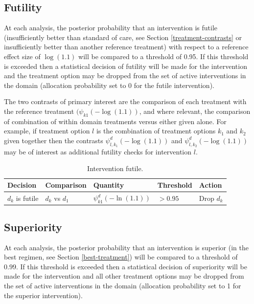 \documentclass[
  11pt,
]{article}
\begin{document}
\hypertarget{futility}{%
\subsection{Futility}\label{futility}}

At each analysis, the posterior probability that an intervention is futile (insufficiently better than standard of care, see Section \ref{treatment-contrasts} or insufficiently better than another reference treatment) with respect to a reference effect size of \(\log(1.1)\) will be compared to a threshold of 0.95.
If this threshold is exceeded then a statistical decision of futility will be made for the intervention and the treatment option may be dropped from the set of active interventions in the domain (allocation probability set to 0 for the futile intervention).

The two contrasts of primary interest are the comparison of each treatment with the reference treatment \((\psi_{k1}(-\log(1.1))\), and where relevant, the comparison of combination of within domain treatments versus either given alone. For example, if treatment option \(l\) is the combination of treatment options \(k_1\) and \(k_2\) given together then the contrasts \(\psi_{l,k_1}^d(-\log(1.1))\) and \(\psi_{l,k_2}^d(-\log(1.1))\) may be of interest as additional futility checks for intervention \(l\).

\begin{table}[H]

\caption{\label{tab:unnamed-chunk-3}Intervention futile.}
\centering
\begin{tabular}[t]{lllll}
\toprule
Decision & Comparison & Quantity & Threshold & Action\\
\midrule
$d_k$ is futile & $d_k$ vs $d_1$ & $\psi_{k1}^d(-\ln(1.1))$ & $>0.95$ & Drop $d_k$\\
\bottomrule
\end{tabular}
\end{table}

\hypertarget{superiority}{%
\subsection{Superiority}\label{superiority}}

At each analysis, the posterior probability that an intervention is superior (in the best regimen, see Section \ref{best-treatment}) will be compared to a threshold of \(0.99\).
If this threshold is exceeded then a statistical decision of superiority will be made for the intervention and all other treatment options may be dropped from the set of active interventions in the domain (allocation probability set to 1 for the superior intervention).
\end{document}
